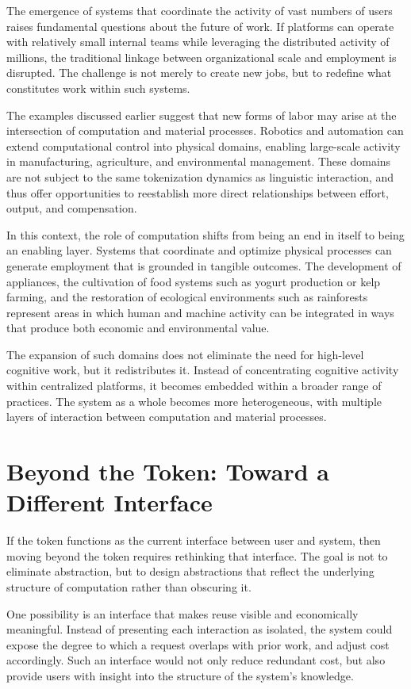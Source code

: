 \documentclass[12pt, oneside]{article}
\begin{document}
The emergence of systems that coordinate the activity of vast numbers of users raises fundamental questions about the future of work. If platforms can operate with relatively small internal teams while leveraging the distributed activity of millions, the traditional linkage between organizational scale and employment is disrupted. The challenge is not merely to create new jobs, but to redefine what constitutes work within such systems.

The examples discussed earlier suggest that new forms of labor may arise at the intersection of computation and material processes. Robotics and automation can extend computational control into physical domains, enabling large-scale activity in manufacturing, agriculture, and environmental management. These domains are not subject to the same tokenization dynamics as linguistic interaction, and thus offer opportunities to reestablish more direct relationships between effort, output, and compensation.

In this context, the role of computation shifts from being an end in itself to being an enabling layer. Systems that coordinate and optimize physical processes can generate employment that is grounded in tangible outcomes. The development of appliances, the cultivation of food systems such as yogurt production or kelp farming, and the restoration of ecological environments such as rainforests represent areas in which human and machine activity can be integrated in ways that produce both economic and environmental value.

The expansion of such domains does not eliminate the need for high-level cognitive work, but it redistributes it. Instead of concentrating cognitive activity within centralized platforms, it becomes embedded within a broader range of practices. The system as a whole becomes more heterogeneous, with multiple layers of interaction between computation and material processes.

\section{Beyond the Token: Toward a Different Interface}

If the token functions as the current interface between user and system, then moving beyond the token requires rethinking that interface. The goal is not to eliminate abstraction, but to design abstractions that reflect the underlying structure of computation rather than obscuring it.

One possibility is an interface that makes reuse visible and economically meaningful. Instead of presenting each interaction as isolated, the system could expose the degree to which a request overlaps with prior work, and adjust cost accordingly. Such an interface would not only reduce redundant cost, but also provide users with insight into the structure of the system's knowledge.
\end{document}
